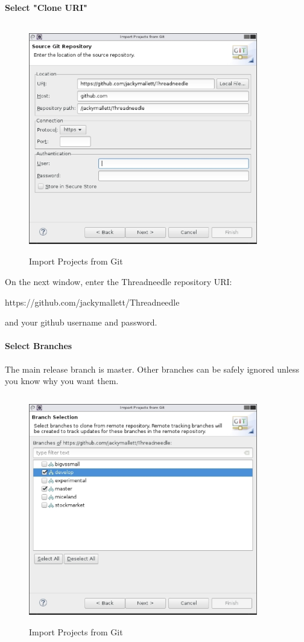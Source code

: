 \documentclass[a4latex]{article}
\begin{document}
\newpage
\paragraph{Select "Clone URI"}
\begin{figure}[ht]
\centering
\includegraphics[height=10cm,width=10cm]{images/fig_importprojects.eps}
\caption{Import Projects from Git}
\label{fig:importprojects}
\end{figure}
\par
On the next window, enter the Threadneedle repository URI:
\begin{center}
https://github.com/jackymallett/Threadneedle
\end{center}
and your github username and password.
\newpage
\paragraph{Select Branches}
The main release branch is master.  Other branches 
can be safely ignored unless you know why you want them.
\begin{figure}[ht]
\centering
\includegraphics[height=10cm,width=10cm]{images/fig_branch.eps}
\caption{Import Projects from Git}
\label{fig:branchselection}
\end{figure}
\par
\end{document}
